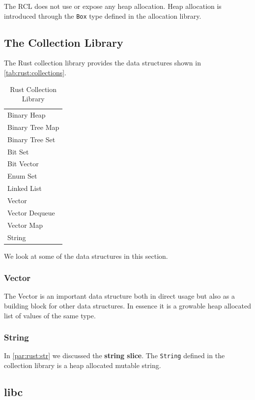 The RCL does not use or expose any heap allocation.
Heap allocation is introduced through the \texttt{Box} type defined in the allocation library.

\subsection{The Collection Library}

The Rust collection library provides the data structures shown in \autoref{tab:rust:collections}.

\begin{table}[H]
  \begin{tabular}{l}
    Binary Heap \\
    Binary Tree Map \\
    Binary Tree Set \\
    Bit Set \\
    Bit Vector \\
    Enum Set \\
    Linked List \\
    Vector \\
    Vector Dequeue \\
    Vector Map \\
    String \\
  \end{tabular}
  \caption{Rust Collection Library}
  \label{tab:rust:collections}
\end{table}

We look at some of the data structures in this section.

\subsubsection{Vector}

The Vector is an important data structure both in direct usage but also as a building block for other data structures.
In essence it is a growable heap allocated list of values of the same type.

\subsubsection{String}

In \autoref{par:rust:str} we discussed the \textbf{string slice}.
The \texttt{String} defined in the collection library is a heap allocated mutable string.

\subsection{libc}

